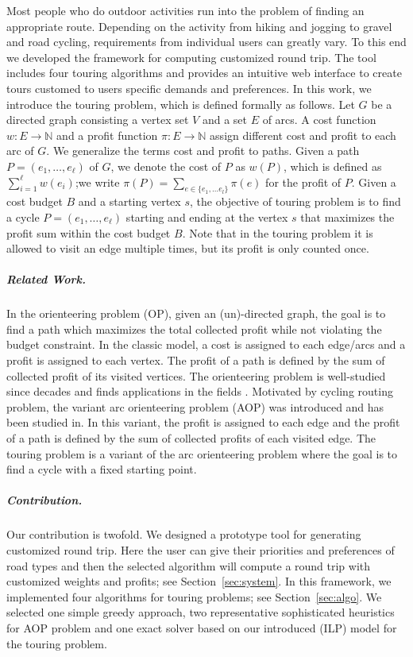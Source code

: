 \documentclass[sigconf,natbib=false]{acmart}
\newcommand{\AOP}{\textsc{AOP}\xspace}
\begin{document}
Most people who do outdoor activities run into the problem of finding an appropriate route. 
Depending on the activity from hiking and jogging to gravel and road cycling, requirements from individual users can greatly vary.
To this end we developed the framework \tG for computing customized round trip. 
The tool \tG includes four touring algorithms and provides an intuitive web interface to create tours customed to users specific demands and preferences. 
In this work, we introduce the touring problem, which is defined formally as follows. 
Let $G$ be a directed graph consisting a vertex set $V$ and a set $E$ of arcs. A cost function $w:E \rightarrow \mathbb{N}$ and a profit function $\pi: E \rightarrow \mathbb{N}$ assign different cost and profit to each arc of $G$.
We generalize the terms cost and profit to paths. Given a path $P = (e_1, \dots, e_{\ell})$ of $G$, we denote the cost of $P$ as $w(P)$, which is defined as $\sum_{i=1}^{\ell} w(e_i)$;we write $\pi(P) = \sum_{ e \in {\{e_1, \ldots e_l\}} } \pi(e)$ for the profit of $P$.  
Given a cost budget $B$ and a starting vertex $s$, the objective of touring problem is to find a cycle $P=(e_1, \dots, e_{\ell})$ starting and ending at the vertex $s$ that maximizes the profit sum within the cost budget $B$. 
Note that in the touring problem it is allowed to visit an edge multiple times, but its profit is only counted once. 
\subparagraph*{\textbf{Related Work.}}
In the orienteering problem (OP), given an (un)-directed graph, the goal is to find a path which maximizes the total collected profit while not violating the budget constraint. In the classic model, a cost is assigned to each edge/arcs and a profit is assigned to each vertex. The profit of a path is defined by the sum of collected profit of its visited vertices. 
The orienteering problem is well-studied since decades and finds applications in the fields . 
Motivated by cycling routing problem, the variant arc orienteering problem (\AOP) was introduced and has been studied in. In this variant, the profit is assigned to each edge and the profit of a path is defined by the sum of collected profits of each visited edge.
The touring problem is a variant of the  arc orienteering problem where the goal is to find a cycle with a fixed starting point. 


\subparagraph*{\textbf{Contribution.}}
Our contribution is twofold. We designed a prototype tool \tG for generating customized round trip. Here the user can give their priorities and preferences of road types and then the selected algorithm will compute a round trip with customized weights and profits; see Section~\ref{sec:system}. In this framework, we implemented four algorithms for touring problems; see Section~\ref{sec:algo}.
We selected one simple greedy approach, two representative sophisticated heuristics for \AOP problem and one exact solver based on our introduced (ILP) model for the touring problem.
\end{document}
